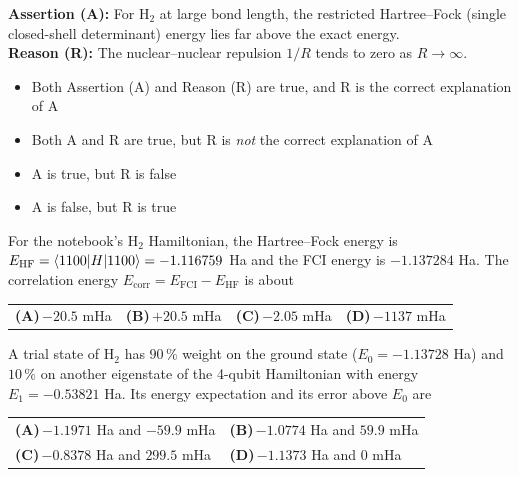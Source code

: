 \documentclass[11pt,a4paper]{article}
\newcommand{\optlabel}[1]{\textbf{(#1)}}
\newenvironment{qitem}[1]{\begin{list}{}{\setlength{\leftmargin}{3.3em}\setlength{\labelwidth}{3.1em}%
  \setlength{\labelsep}{0.2em}\setlength{\topsep}{3pt}\setlength{\parsep}{3pt}}\item[\textbf{Q.#1}\hfill]}{\end{list}}
\newcommand{\qsep}{\par\vspace{2pt}{\color{black!15}\hrule}\vspace{4pt}}
\begin{document}
\begin{qitem}{18}
\textbf{Assertion (A):} For H$_2$ at large bond length, the restricted Hartree--Fock (single closed-shell determinant) energy lies far above
the exact energy.\\[1mm]
\textbf{Reason (R):} The nuclear--nuclear repulsion $1/R$ tends to zero as $R \to \infty$.
\begin{itemize}[leftmargin=2.6em, labelsep=0.4em, itemsep=2pt, topsep=3pt]
\item[\optlabel{A}] Both Assertion (A) and Reason (R) are true, and R is the correct explanation of A
\item[\optlabel{B}] Both A and R are true, but R is \emph{not} the correct explanation of A
\item[\optlabel{C}] A is true, but R is false
\item[\optlabel{D}] A is false, but R is true
\end{itemize}
\end{qitem}
\qsep

\begin{qitem}{19}
For the notebook's H$_2$ Hamiltonian, the Hartree--Fock energy is $E_{\mathrm{HF}} = \braket{1100|H|1100} = -1.116759$ Ha and the FCI energy is
$-1.137284$ Ha. The correlation energy $E_{\mathrm{corr}} = E_{\mathrm{FCI}} - E_{\mathrm{HF}}$ is about
\par\smallskip\noindent\begin{tabularx}{\linewidth}{@{}*{4}{L}@{}}
\optlabel{A}\,$-20.5$ mHa & \optlabel{B}\,$+20.5$ mHa & \optlabel{C}\,$-2.05$ mHa & \optlabel{D}\,$-1137$ mHa
\end{tabularx}
\end{qitem}
\qsep

\begin{qitem}{20}
A trial state of H$_2$ has $90\,\%$ weight on the ground state ($E_0 = -1.13728$ Ha) and $10\,\%$ on another eigenstate of the 4-qubit Hamiltonian with energy
$E_1 = -0.53821$ Ha. Its energy expectation and its error above $E_0$ are
\par\smallskip\noindent\begin{tabularx}{\linewidth}{@{}*{2}{L}@{}}
\optlabel{A}\,$-1.1971$ Ha and $-59.9$ mHa & \optlabel{B}\,$-1.0774$ Ha and $59.9$ mHa \\[3pt]
\optlabel{C}\,$-0.8378$ Ha and $299.5$ mHa & \optlabel{D}\,$-1.1373$ Ha and $0$ mHa
\end{tabularx}
\end{qitem}
\qsep
\end{document}
